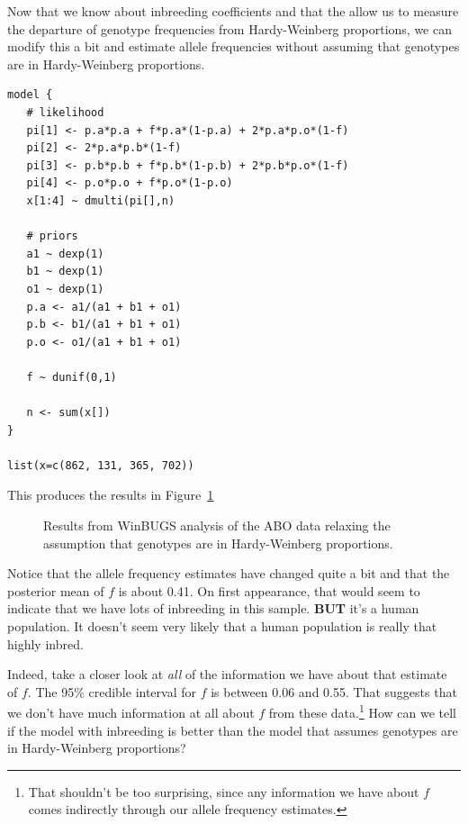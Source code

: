 \documentclass[12pt]{article}
\begin{document}
Now that we know about inbreeding coefficients and that the allow us
to measure the departure of genotype frequencies from Hardy-Weinberg
proportions, we can modify this a bit and estimate allele frequencies
without assuming that genotypes are in Hardy-Weinberg proportions.
\begin{verbatim}
model {
   # likelihood 
   pi[1] <- p.a*p.a + f*p.a*(1-p.a) + 2*p.a*p.o*(1-f)
   pi[2] <- 2*p.a*p.b*(1-f)
   pi[3] <- p.b*p.b + f*p.b*(1-p.b) + 2*p.b*p.o*(1-f)
   pi[4] <- p.o*p.o + f*p.o*(1-p.o)
   x[1:4] ~ dmulti(pi[],n)

   # priors
   a1 ~ dexp(1)
   b1 ~ dexp(1)
   o1 ~ dexp(1)
   p.a <- a1/(a1 + b1 + o1)
   p.b <- b1/(a1 + b1 + o1)
   p.o <- o1/(a1 + b1 + o1)

   f ~ dunif(0,1)

   n <- sum(x[])
}

list(x=c(862, 131, 365, 702))
\end{verbatim}
This produces the results in Figure~\ref{fig:ABO-inbreeding}

\begin{figure}
\caption{Results from WinBUGS analysis of the ABO
  data relaxing the assumption that genotypes are in Hardy-Weinberg proportions.}\label{fig:ABO-inbreeding}
\end{figure}

Notice that the allele frequency estimates have changed quite a bit
and that the posterior mean of $f$ is about 0.41. On first appearance,
that would seem to indicate that we have lots of inbreeding in this
sample. {\bf BUT} it's a human population. It doesn't seem very
likely that a human population is really that highly inbred. 

Indeed, take a closer look at {\it all\/} of the information we have
about that estimate of $f$. The 95\% credible interval for $f$ is
between 0.06 and 0.55. That suggests that we don't have much
information at all about $f$ from these data.\footnote{That shouldn't
  be too surprising, since any information we have about $f$ comes
  indirectly through our allele frequency estimates.} How can we tell
if the model with inbreeding is better than the model that assumes
genotypes are in Hardy-Weinberg proportions?
\end{document}
